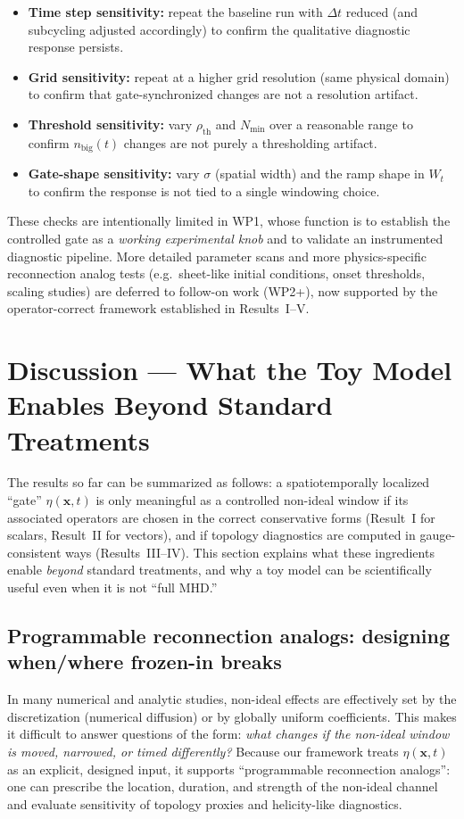 \documentclass[11pt]{article}
\theoremstyle{plain}
\theoremstyle{definition}
\theoremstyle{remark}
\begin{document}
\begin{itemize}[leftmargin=*]
  \item \textbf{Time step sensitivity:} repeat the baseline run with $\Delta t$ reduced (and subcycling
  adjusted accordingly) to confirm the qualitative diagnostic response persists.
  \item \textbf{Grid sensitivity:} repeat at a higher grid resolution (same physical domain) to confirm
  that gate-synchronized changes are not a resolution artifact.
  \item \textbf{Threshold sensitivity:} vary $\rho_{\text{th}}$ and $N_{\min}$ over a reasonable range to
  confirm $n_{\text{big}}(t)$ changes are not purely a thresholding artifact.
  \item \textbf{Gate-shape sensitivity:} vary $\sigma$ (spatial width) and the ramp shape in $W_t$ to
  confirm the response is not tied to a single windowing choice.
\end{itemize}

These checks are intentionally limited in WP1, whose function is to establish the controlled gate as a
\emph{working experimental knob} and to validate an instrumented diagnostic pipeline. More detailed
parameter scans and more physics-specific reconnection analog tests (e.g.\ sheet-like initial
conditions, onset thresholds, scaling studies) are deferred to follow-on work (WP2+), now supported by
the operator-correct framework established in Results~I--V.

\section{Discussion --- What the Toy Model Enables Beyond Standard Treatments}\label{sec:discussion}

The results so far can be summarized as follows: a spatiotemporally localized ``gate''
$\eta(\mathbf{x},t)$ is only meaningful as a controlled non-ideal window if its associated operators are
chosen in the correct conservative forms (Result~I for scalars, Result~II for vectors), and if topology
diagnostics are computed in gauge-consistent ways (Results~III--IV). This section explains what these
ingredients enable \emph{beyond} standard treatments, and why a toy model can be scientifically useful
even when it is not ``full MHD.''

\subsection{Programmable reconnection analogs: designing when/where frozen-in breaks}\label{sec:discussion_programmable}
In many numerical and analytic studies, non-ideal effects are effectively set by the discretization
(numerical diffusion) or by globally uniform coefficients. This makes it difficult to answer questions
of the form: \emph{what changes if the non-ideal window is moved, narrowed, or timed differently?}
Because our framework treats $\eta(\mathbf{x},t)$ as an explicit, designed input, it supports
``programmable reconnection analogs'': one can prescribe the location, duration, and strength of the
non-ideal channel and evaluate sensitivity of topology proxies and helicity-like diagnostics.
\end{document}
